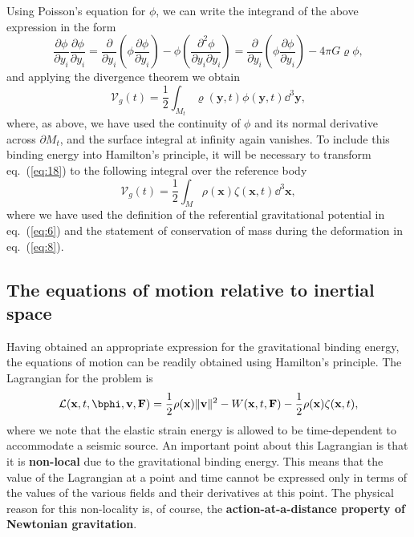 Using Poisson's equation for $\phi$, we can write the integrand of the above expression in the form
\begin{equation}
\frac{\partial\phi}{\partial y_{i}}\frac{\partial\phi}{\partial y_{i}}=\frac{\partial}{\partial y_{i}}
\left(\phi\frac{\partial\phi}{\partial y_{i}}\right)-\phi\left(\frac{\partial^{2}\phi}{\partial y_{i}
\partial y_{i}}\right)=\frac{\partial}{\partial y_{i}}\left(\phi\frac{\partial\phi}{\partial y_{i}}\right)-4\pi G\varrho\phi,
\label{eq:17}
\end{equation}
and applying the divergence theorem we obtain
\begin{equation}
\mathcal{V}_{g}(t)=\frac{1}{2}\int_{M_{t}}\varrho(\mathbf{y},t)\phi(\mathbf{y},t)\dd^{3}\mathbf{y},
\label{eq:18}
\end{equation}
where, as above, we have used the continuity of $\phi$ and its normal derivative across $\partial M_{t}$, 
and the surface integral at infinity again vanishes. To include this binding energy into Hamilton's principle, 
it will be necessary to transform eq.~(\ref{eq:18}) to the following integral over the reference body
\begin{equation}
\mathcal{V}_{g}(t)=\frac{1}{2}\int_{M}\rho(\mathbf{x})\zeta(\mathbf{x},t)\dd^{3}\mathbf{x},
\label{eq:19}
\end{equation}
where we have used the definition of the referential gravitational potential in eq.~(\ref{eq:6}) and the statement of 
conservation of mass during the deformation in eq.~(\ref{eq:8}).

\subsection*{The equations of motion relative to inertial space}

Having obtained an appropriate expression for the gravitational binding energy, the equations of motion can 
be readily obtained using Hamilton's principle. The Lagrangian for the problem is
\begin{equation}
\mathcal{L}(\mathbf{x},t,\bphi,\mathbf{v},\mathbf{F})=\frac{1}{2}\rho(\mathbf{x})\|\mathbf{v}\|^{2}
-W(\mathbf{x},t,\mathbf{F})-\frac{1}{2}\rho(\mathbf{x})\zeta(\mathbf{x},t),
\label{eq:20}
\end{equation}
where we note that the elastic strain energy is allowed to be time-dependent to accommodate a seismic source. 
An important point about this Lagrangian is that it is \textbf{non-local} due to the gravitational binding energy. This 
means that the value of the Lagrangian at a point and time cannot be expressed only in terms of the values of 
the various fields and their derivatives at this point. The physical reason for this non-locality is, of course, 
the \textbf{action-at-a-distance property of Newtonian gravitation}. 

